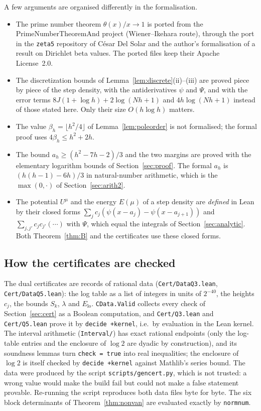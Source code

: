 \documentclass[11pt]{amsart}
\theoremstyle{definition}
\theoremstyle{remark}
\numberwithin{equation}{section}
\newcommand{\lean}[1]{{\def\_{\textunderscore\allowbreak}\texttt{#1}}}
\begin{document}
A few arguments are organised differently in the formalisation.
\begin{itemize}
\item The prime number theorem $\theta(x)/x\to1$ is ported from the PrimeNumberTheoremAnd project \cite{PNTplus}
  (Wiener--Ikehara route), through the port in the \lean{zeta5} repository of C\'esar Del Solar \cite{zeta5} and the
  author's formalisation \cite{BetaRepo} of a result on Dirichlet beta values. The ported files keep their Apache
  License~2.0.
\item The discretization bounds of Lemma~\ref{lem:discrete}(ii)--(iii) are proved piece by piece of the step density,
  with the antiderivatives $\psi$ and $\Psi$, and with the error terms $8J(1+\log h)+2\log(Nh+1)$ and $4h\log(Nh+1)$
  instead of those stated here. Only their size $O(h\log h)$ matters.
\item The value $\beta_h=\lfloor h^2/4\rfloor$ of Lemma~\ref{lem:poleorder} is not formalised; the formal proof uses
  $4\beta_h\le h^2+2h$.
\item The bound $a_h\ge(h^2-7h-2)/3$ and the two margins are proved with the elementary logarithm bounds of
  Section~\ref{sec:proof}. The formal $a_h$ is $(h(h-1)-6h)/3$ in natural-number arithmetic, which is the
  $\max(0,\cdot)$ of Section~\ref{sec:arith2}.
\item The potential $U^\mu$ and the energy $E(\mu)$ of a step density are \emph{defined} in Lean by their closed forms
  $\sum_jc_j(\psi(x-a_j)-\psi(x-a_{j+1}))$ and $\sum_{j,j'}c_jc_{j'}(\cdots)$ with $\Psi$, which equal the integrals of
  Section~\ref{sec:analytic}. Both Theorem~\ref{thm:B} and the certificates use these closed forms.
\end{itemize}

\subsection{How the certificates are checked}
The dual certificates are records of rational data (\lean{Cert\slash{}DataQ3.lean}, \lean{Cert\slash{}DataQ5.lean}): the
log table as a list of integers in units of $2^{-40}$, the heights $c_j$, the bounds $S_k$, $\lambda$ and $E_{\mathrm{lo}}$.
\lean{CData.Valid} collects every check of Section~\ref{sec:cert} as a Boolean computation, and \lean{Cert\slash{}Q3.lean}
and \lean{Cert\slash{}Q5.lean} prove it by \lean{decide +kernel}, i.e.\ by evaluation in the Lean kernel. The interval
arithmetic (\lean{Interval\slash{}}) has exact rational endpoints (only the log-table entries and the enclosure of $\log2$
are dyadic by construction), and its soundness lemmas turn
\lean{check = true} into real inequalities; the enclosure of $\log2$ is itself checked by \lean{decide +kernel}
against Mathlib's series bound. The data were produced by the script \lean{scripts\slash{}gen\_cert.py}, which is not
trusted: a wrong value would make the build fail but could not make a false statement provable. Re-running the
script reproduces both data files byte for byte. The six block determinants of Theorem~\ref{thm:nonvan} are evaluated
exactly by \lean{norm\_num}.
\end{document}
